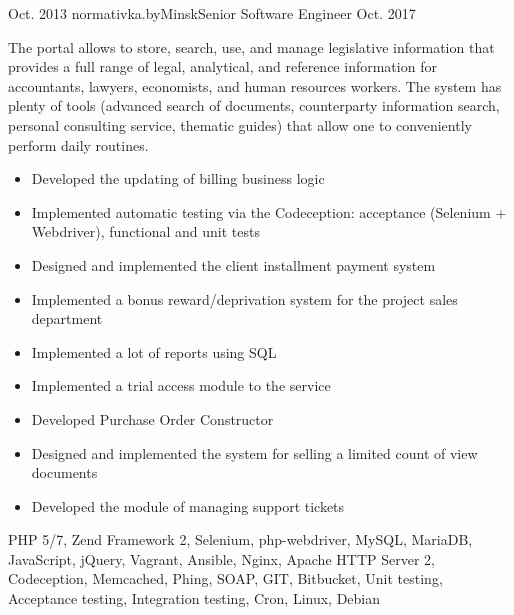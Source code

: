 \begin{experiences}
  \experience
    {Oct. 2013} {normativka.by}{Minsk}{Senior Software Engineer}
    {Oct. 2017}
    {
      The portal allows to store, search, use, and manage legislative information that provides a full range of legal,
      analytical, and reference information for accountants, lawyers, economists, and human resources workers.
      The system has plenty of tools (advanced search of documents, counterparty information search, personal consulting service,
      thematic guides) that allow one to conveniently perform daily routines.
      \begin{itemize}
        \item {Developed the updating of billing business logic}
        \item {Implemented automatic testing via the Codeception: acceptance (Selenium + Webdriver), functional and unit tests}
        \item {Designed and implemented the client installment payment system}
        \item {Implemented a bonus reward/deprivation system for the project sales department}
        \item {Implemented a lot of reports using SQL}
        \item {Implemented a trial access module to the service}
        \item {Developed Purchase Order Constructor}
        \item {Designed and implemented the system for selling a limited count of view documents}
        \item {Developed the module of managing support tickets}
      \end{itemize}
    }
    {
      PHP 5/7, Zend Framework 2, Selenium, php-webdriver, MySQL, MariaDB, JavaScript, jQuery, Vagrant, Ansible, Nginx,
      Apache HTTP Server 2, Codeception, Memcached, Phing, SOAP, GIT, Bitbucket, Unit testing, Acceptance testing,
      Integration testing, Cron, Linux, Debian
    }
  \emptySeparator


\end{experiences}
